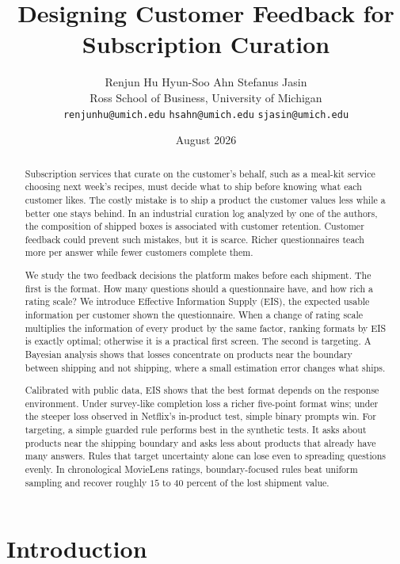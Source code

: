 \documentclass[11pt]{article}
\title{\vspace{-1em}\textbf{Designing Customer Feedback for Subscription Curation}}
\author{
Renjun Hu \qquad Hyun-Soo Ahn \qquad Stefanus Jasin \\[0.6em]
Ross School of Business, University of Michigan \\[0.25em]
\small \texttt{renjunhu@umich.edu} \qquad \texttt{hsahn@umich.edu} \qquad \texttt{sjasin@umich.edu}
}
\date{August 2026}
\theoremstyle{definition}
\theoremstyle{remark}
\newcommand{\1}{\mathbf{1}}
\begin{document}
\maketitle

\begin{abstract}
Subscription services that curate on the customer's behalf, such as a
meal-kit service choosing next week's recipes, must decide what to ship
before knowing what each customer likes. The costly mistake is to ship
a product the customer values less while a better one stays behind. In
an industrial curation log analyzed by one of the authors, the
composition of shipped boxes is associated with customer retention.
Customer feedback could prevent such mistakes, but it is scarce.
Richer questionnaires teach more per answer while fewer customers
complete them.

We study the two feedback decisions the platform makes before each
shipment. The first is the format. How many questions should a
questionnaire have, and how rich a rating scale? We introduce Effective
Information Supply (EIS), the expected usable information per customer
shown the questionnaire. When a change of rating scale multiplies the
information of every product by the same factor, ranking formats by EIS
is exactly optimal; otherwise it is a practical first screen. The
second is targeting. A Bayesian analysis shows that losses concentrate
on products near the boundary between shipping and not shipping, where
a small estimation error changes what ships.

Calibrated with public data, EIS shows that the best format depends on
the response environment. Under survey-like completion loss a richer
five-point format wins; under the steeper loss observed in Netflix's
in-product test, simple binary prompts win. For targeting, a simple guarded rule performs best in the synthetic
tests. It asks about products near the shipping boundary and asks less
about products that already have many answers. Rules that target
uncertainty alone can lose even to spreading questions evenly. In chronological MovieLens ratings, boundary-focused rules beat uniform
sampling and recover roughly \(15\) to \(40\) percent of the lost
shipment value.
\end{abstract}

\section{Introduction}
\end{document}
